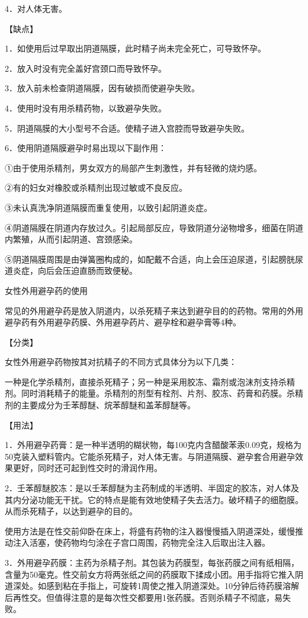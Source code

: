 \documentclass[12pt,UTF8]{ctexbook}
\begin{document}
4．对人体无害。

【缺点】

1．如使用后过早取出阴道隔膜，此时精子尚未完全死亡，可导致怀孕。

2．放入时没有完全盖好宫颈口而导致怀孕。

3．放入前未检查阴道隔膜，因有破损而使避孕失败。

4．使用时没有用杀精药物，以致避孕失败。

5．阴道隔膜的大小型号不合适。使精子进入宫腔而导致避孕失败。

6．使用阴道隔膜避孕时易出现以下副作用：

①由于使用杀精剂，男女双方的局部产生刺激性，并有轻微的烧灼感。

②有的妇女对橡胶或杀精剂出现过敏或不良反应。

③未认真洗净阴道隔膜而重复使用，以致引起阴道炎症。

④阴道隔膜在阴道内存放过久。引起局部反应，导致阴道分泌物增多，细菌在阴道内繁殖，从而引起阴道、宫颈感染。

⑤阴道隔膜周围是由弹簧圈构成的，如配戴不合适，向上会压迫尿道，引起膀胱尿道炎症，向后会压迫直肠而致便秘。





女性外用避孕药的使用


常见的外用避孕药是放入阴道内，以杀死精子来达到避孕目的的药物。常用的外用避孕药有外用避孕药膜、外用避孕药片、避孕栓和避孕膏等4种。

【分类】

女性外用避孕药物按其对抗精子的不同方式具体分为以下几类：

一种是化学杀精剂，直接杀死精子；另一种是采用胶冻、霜剂或泡沫剂支持杀精剂。同时消耗精子的能量。杀精剂的剂型有栓剂、片剂、胶冻、药膏和药膜。杀精剂的主要成分为壬苯醇醚、烷苯醇醚和盖苯醇醚等。

【用法】

1．外用避孕药膏：是一种半透明的糊状物，每100克内含醋酸苯汞0.09克，规格为50克装入塑料管内。它能杀死精子，对人体无害。与阴道隔膜、避孕套合用避孕效果更好，同时还可起到性交时的滑润作用。

2．壬苯醇醚胶冻：是以壬苯醇醚为主药制成的半透明、半固定的胶冻，对人体及其内分泌功能无干扰。它的特点是能有效地使精子失去活力。破坏精子的细胞膜。从而杀死精子，以达到避孕的目的。

使用方法是在性交前仰卧在床上，将盛有药物的注入器慢慢插入阴道深处，缓慢推动注入活塞，使药物均匀涂在子宫口周围，药物完全注入后取出注入器。

3．外用避孕药膜：主药为杀精子剂。其包装为药膜型，每张药膜之间有纸相隔，含量为50毫克。性交前女方将两张纸之间的药膜取下揉成小团。用手指将它推入阴道深处。如感到粘在手指上，可旋转1周使之推入阴道深处。10分钟后待药膜溶解后再性交。但值得注意的是每次性交都要用1张药膜。否则杀精子不彻底，易失败。
\end{document}
